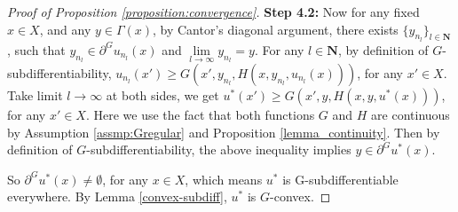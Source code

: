 \documentclass[a4paper, 11pt]{amsart}
\numberwithin{equation}{section}
\theoremstyle{plain}
\theoremstyle{definition}
\theoremstyle{remark}
\newcommand{\N}{\mathbf{N}}
\begin{document}
\begin{proof}[Proof of Proposition \ref{proposition:convergence}]
	
	{\bf Step 4.2:} Now for any fixed $x\in X$, and any $y\in \Gamma(x)$, by Cantor's diagonal argument, there exists $\{y_{n_l}\}_{l\in \N}$, such that $y_{n_l} \in \partial^G u_{n_l}(x)$ and $\lim\limits_{l\rightarrow \infty} y_{n_l} = y$.
	For any $l\in \N$, by definition of $G$-subdifferentiability,
	$u_{n_l}(x')\ge G(x', y_{n_l}, H(x, y_{n_l}, u_{n_l}(x)))$, for any $x' \in X$. Take limit $l \longrightarrow \infty$ at both sides, we get $u^*(x') \ge G(x', y, H(x, y, u^*(x)))$, for any $x'\in X$. Here we use the fact that both functions $G$ and
		$H$ are continuous by Assumption \ref{assmp:Gregular} and Proposition \ref{lemma_continuity}.
Then by definition of $G$-subdifferentiability, the above inequality implies $y\in \partial ^G u^*(x)$. 

	So $\partial^G u^*(x)\neq \emptyset$, for any $x\in X$, which means $u^*$ is G-subdifferentiable everywhere. By Lemma \ref{convex-subdiff}, $u^*$ is $G$-convex.
\end{proof}

\vspace{0.3cm}
\end{document}
